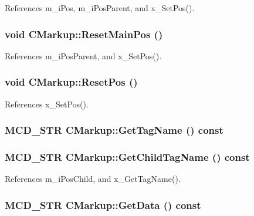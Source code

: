 References m\_\-iPos, m\_\-iPosParent, and x\_\-SetPos().
\subsubsection[ResetMainPos]{\setlength{\rightskip}{0pt plus 5cm}void CMarkup::ResetMainPos ()\hspace{0.3cm}{\tt  [inline]}}\label{classCMarkup_17a436dfc77e82619ad186e784a26ce7}




References m\_\-iPosParent, and x\_\-SetPos().
\subsubsection[ResetPos]{\setlength{\rightskip}{0pt plus 5cm}void CMarkup::ResetPos ()\hspace{0.3cm}{\tt  [inline]}}\label{classCMarkup_834ff734949071455e5808aaf7c82f03}




References x\_\-SetPos().
\subsubsection[GetTagName]{\setlength{\rightskip}{0pt plus 5cm}MCD\_\-STR CMarkup::GetTagName () const}\label{classCMarkup_0fcd179bb0ba35d6a262d571c1ef1004}


\subsubsection[GetChildTagName]{\setlength{\rightskip}{0pt plus 5cm}MCD\_\-STR CMarkup::GetChildTagName () const\hspace{0.3cm}{\tt  [inline]}}\label{classCMarkup_2409a176f7a964dc6e0bf73f5ba47863}




References m\_\-iPosChild, and x\_\-GetTagName().
\subsubsection[GetData]{\setlength{\rightskip}{0pt plus 5cm}MCD\_\-STR CMarkup::GetData () const\hspace{0.3cm}{\tt  [inline]}}\label{classCMarkup_1a671b10223425ac4fc600c96366b0d2}




